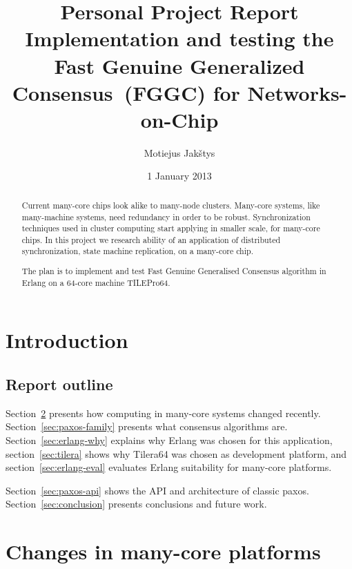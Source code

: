 \documentclass[english,11pt]{l4proj}
\newcommand{\fggc}{Fast Genuine Generalized Consensus}
\begin{document}
\title{Personal Project Report\\
    Implementation and testing the \fggc\ (FGGC) for Networks-on-Chip}
\author{Motiejus Jakštys}
\date{1 January 2013}

\maketitle

\begin{abstract}

Current many-core chips look alike to many-node clusters. Many-core systems,
like many-machine systems, need redundancy in order to be robust.
Synchronization techniques used in cluster computing start applying in smaller
scale, for many-core chips. In this project we research ability of an
application of distributed synchronization, state machine replication, on a
many-core chip.

The plan is to implement and test Fast Genuine Generalised Consensus algorithm
in Erlang on a 64-core machine TILEPro64.

\end{abstract}

\tableofcontents
\pagebreak

\section{Introduction}

\subsection{Report outline}

Section~\ref{sec:many-core} presents how computing in many-core systems changed
recently. Section~\ref{sec:paxos-family} presents what consensus algorithms
are. Section~\ref{sec:erlang-why} explains why Erlang was chosen for this
application, section~\ref{sec:tilera} shows why Tilera64 was chosen as
development platform, and section~\ref{sec:erlang-eval} evaluates Erlang
suitability for many-core platforms.

Section~\ref{sec:paxos-api} shows the API and architecture of classic paxos.
Section~\ref{sec:conclusion} presents conclusions and future work.

\section{Changes in many-core platforms}
\label{sec:many-core}
\end{document}

